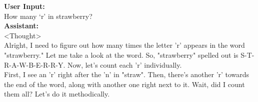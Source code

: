 \begin{abox} 
\textbf{User Input:}\\
How many `r' in strawberry? \\

\textbf{Assistant:}\\
<Thought>\\
Alright, I need to figure out how many times the letter 'r' appears in the word "strawberry." Let me take a look at the word. So, "strawberry" spelled out is S-T-R-A-W-B-E-R-R-Y. Now, let's count each 'r' individually.\\

First, I see an 'r' right after the 'n' in "straw". Then, there's another 'r' towards the end of the word, along with another one right next to it. Wait, did I count them all? Let's do it methodically.\\

\end{abox}
